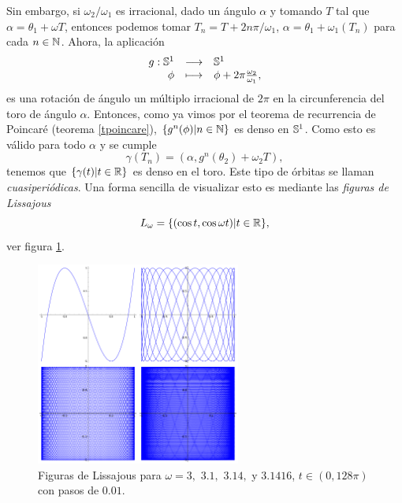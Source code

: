   Sin embargo, si $\omega_2/\omega_1$ es irracional, dado un ángulo $\alpha$ y tomando $T$ tal que $\alpha=\theta_1+\omega T$, entonces podemos tomar $T_n=T+2n\pi/\omega_1$, $\alpha=\theta_1+\omega_1(T_n)$ para cada $n\in \mathbb{N}$. Ahora, la aplicación
  \begin{equation*}
    \begin{array}{rcl}
    g:\mathbb{S}^1 & \longrightarrow &\mathbb{S}^1 \\
  \phi & \longmapsto & \phi + 2\pi\frac{\omega_2}{\omega_1},
  \end{array}
\end{equation*}
es una rotación de ángulo un múltiplo irracional de $2\pi$ en la circunferencia del toro de ángulo $\alpha$. Entonces, como ya vimos por el teorema de recurrencia de Poincaré (teorema \ref{tpoincare}), $\{g^n(\phi)|n\in \mathbb{N}\}$ es denso en $\mathbb{S}^1$. Como esto es válido para todo $\alpha$ y se cumple 
\begin{equation*}
  \gamma(T_n)=(\alpha,g^n(\theta_2)+\omega_2 T),
\end{equation*}
tenemos que $\{\gamma(t)|t \in \mathbb{R} \}$ es denso en el toro. Este tipo de órbitas se llaman \emph{cuasiperiódicas}. Una forma sencilla de visualizar esto es mediante las \emph{figuras de Lissajous} 
\begin{equation*}
  L_{\omega}=\{(\cos t, \cos \omega t) | t \in \mathbb{R}\},
\end{equation*}
ver figura \ref{fig:lissajous}.
\begin{figure}[h!]
  \centering
  \includegraphics[width=0.6\textwidth]{pics/lissajous}
  \caption{\small Figuras de Lissajous para $\omega=3,$ $3.1,$ $3.14,$  y $3.1416$, $t \in (0,128\pi)$ con pasos de $0.01$.}
  \label{fig:lissajous}
\end{figure}

